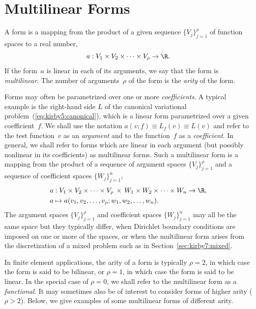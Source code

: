 
\section{Multilinear Forms}

A form is a mapping from the product of a given sequence
$\{V_j\}_{j=1}^{\rho}$ of function spaces to a real number,
\begin{displaymath}
  a : V_1 \times V_2 \times \cdots \times V_{\rho} \rightarrow \R.
\end{displaymath}
If the form~$a$ is linear in each of its arguments, we say that the
form is \emph{multilinear}. The number of arguments~$\rho$ of the form
is the \emph{arity} of the form.

Forms may often be parametrized over one or more
\emph{coefficients}. A typical example is the right-hand side $L$ of
the canonical variational problem~(\ref{eq:kirby5:canonical}), which
is a linear form parametrized over a given coefficient~$f$. We shall
use the notation $a(v; f) \equiv L_f(v) \equiv L(v)$ and refer to the
test function~$v$ as an \emph{argument} and to the function~$f$ as
a \emph{coefficient}. In general, we shall refer to forms which are
linear in each argument (but possibly nonlinear in its coefficients)
as multilinear forms. Such a multilinear form is a mapping from the
product of a sequence of argument spaces $\{V_j\}_{j=1}^{\rho}$ and a
sequence of coefficient spaces $\{W_j\}_{j=1}^n$,
\begin{displaymath}
  \begin{split}
    a &: V_1 \times V_2 \times \cdots \times V_{\rho} \, \times \,
         W_1 \times W_2 \times \cdots \times W_n \rightarrow \R, \\
    a &\mapsto a(v_1, v_2, \ldots, v_{\rho}; w_1, w_2, \ldots, w_n).
  \end{split}
\end{displaymath}
The argument spaces $\{V_j\}_{j=1}^{\rho}$ and coefficient spaces
$\{W_j\}_{j=1}^n$ may all be the same space but they typically differ,
when Dirichlet boundary conditions are imposed on one or more of the
spaces, or when the multilinear form arises from the discretization of
a mixed problem such as in Section~\ref{sec:kirby7:mixed}.

In finite element applications, the arity of a form is typically $\rho
= 2$, in which case the form is said to be bilinear, or $\rho = 1$, in
which case the form is said to be linear. In the special case of $\rho
= 0$, we shall refer to the multilinear form as a
\emph{functional}. It may sometimes also be of interest to consider forms of
higher arity ($\rho > 2$). Below, we give examples of some multilinear
forms of different arity.

